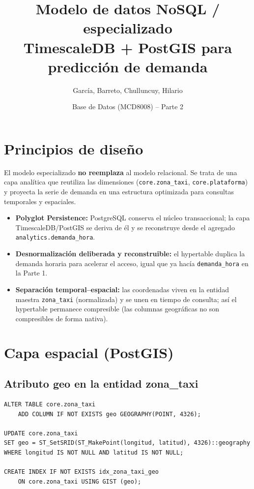 \documentclass[11pt,a4paper]{article}
\title{\textbf{Modelo de datos NoSQL / especializado}\\[0.3em]
\Large TimescaleDB + PostGIS para predicción de demanda}
\author{García, Barreto, Chulluncuy, Hilario}
\date{Base de Datos (MCD8008) -- Parte 2}
\begin{document}
\maketitle

\section{Principios de diseño}

El modelo especializado \textbf{no reemplaza} al modelo relacional. Se trata de una capa
analítica que reutiliza las dimensiones (\texttt{core.zona\_taxi}, \texttt{core.plataforma})
y proyecta la serie de demanda en una estructura optimizada para consultas temporales y
espaciales.

\begin{itemize}
  \item \textbf{Polyglot Persistence:} PostgreSQL conserva el núcleo transaccional; la capa
        TimescaleDB/PostGIS se deriva de él y se reconstruye desde el agregado
        \texttt{analytics.demanda\_hora}.
  \item \textbf{Desnormalización deliberada y reconstruible:} el hypertable duplica la demanda
        horaria para acelerar el acceso, igual que ya hacía \texttt{demanda\_hora} en la Parte 1.
  \item \textbf{Separación temporal--espacial:} las coordenadas viven en la entidad maestra
        \texttt{zona\_taxi} (normalizada) y se unen en tiempo de consulta; así el hypertable
        permanece compresible (las columnas geográficas no son compresibles de forma nativa).
\end{itemize}

\section{Capa espacial (PostGIS)}

\subsection{Atributo geo en la entidad zona\_taxi}
\begin{lstlisting}
ALTER TABLE core.zona_taxi
    ADD COLUMN IF NOT EXISTS geo GEOGRAPHY(POINT, 4326);

UPDATE core.zona_taxi
SET geo = ST_SetSRID(ST_MakePoint(longitud, latitud), 4326)::geography
WHERE longitud IS NOT NULL AND latitud IS NOT NULL;

CREATE INDEX IF NOT EXISTS idx_zona_taxi_geo
    ON core.zona_taxi USING GIST (geo);
\end{lstlisting}
\end{document}
